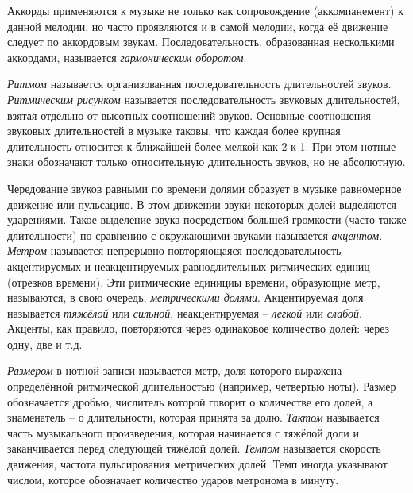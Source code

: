Аккорды применяются к музыке не только как сопровождение (аккомпанемент) к
данной мелодии, но часто проявляются и в самой мелодии, когда её движение
следует по аккордовым звукам. Последовательность, образованная несколькими
аккордами, называется \emph{гармоническим оборотом}. 


\emph{Ритмом} называется организованная последовательность длительностей звуков.
\emph{Ритмическим рисунком} называется последовательность звуковых
длительностей, взятая отдельно от высотных соотношений звуков. Основные
соотношения звуковых длительностей в музыке таковы, что каждая более крупная
длительность относится к ближайшей более мелкой как 2 к 1. При этом нотные
знаки обозначают только относительную длительность звуков, но не абсолютную.

Чередование звуков равными по времени долями образует в музыке равномерное
движение или пульсацию. В этом движении звуки некоторых долей выделяются
ударениями. Такое выделение звука посредством большей громкости (часто также
длительности) по сравнению с окружающими звуками называется \emph{акцентом}.
\emph{Метром} называется непрерывно повторяющаяся последовательность
акцентируемых и неакцентируемых равнодлительных ритмических единиц (отрезков
времени). Эти ритмические единициы времени, образующие метр, называются, в свою
очередь, \emph{метрическими долями}. Акцентируемая доля называется
\emph{тяжёлой} или \emph{сильной}, неакцентируемая -- \emph{легкой} или
\emph{слабой}. Акценты, как правило, повторяются через одинаковое количество
долей: через одну, две и т.д.

\emph{Размером} в нотной записи называется метр, доля которого выражена
определённой ритмической длительностью (например, четвертью ноты). Размер
обозначается дробью, числитель которой говорит о количестве его долей, а
знаменатель -- о длительности, которая принята за долю. \emph{Тактом} называется
часть музыкального произведения, которая начинается с тяжёлой доли и
заканчивается перед следующей тяжёлой долей. \emph{Темпом} называется скорость
движения, частота пульсирования метрических долей. Темп иногда указывают числом,
которое обозначает количество ударов метронома в минуту.

